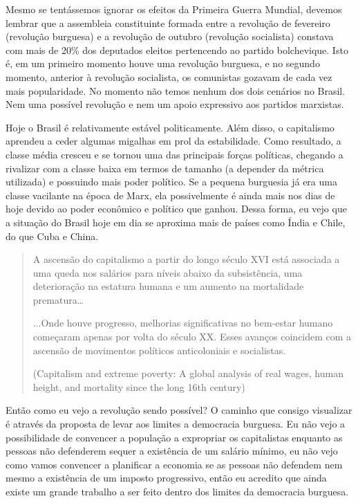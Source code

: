 Mesmo se tentássemos ignorar os efeitos da Primeira Guerra Mundial, devemos lembrar que a assembleia constituinte formada entre a revolução de fevereiro (revolução burguesa) e a revolução de outubro (revolução socialista) constava com mais de 20\% dos deputados eleitos pertencendo ao partido bolchevique. Isto é, em um primeiro momento houve uma revolução burguesa, e no segundo momento, anterior à revolução socialista, os comunistas gozavam de cada vez mais popularidade. No momento não temos nenhum dos dois cenários no Brasil. Nem uma possível revolução e nem um apoio expressivo aos partidos marxistas.

Hoje o Brasil é relativamente estável politicamente. Além disso, o capitalismo aprendeu a ceder algumas migalhas em prol da estabilidade. Como resultado, a classe média cresceu e se tornou uma das principais forças políticas, chegando a rivalizar com a classe baixa em termos de tamanho (a depender da métrica utilizada) e possuindo mais poder político. Se a pequena burguesia já era uma classe vacilante na época de Marx, ela possivelmente é ainda mais nos dias de hoje devido ao poder econômico e político que ganhou. Dessa forma, eu vejo que a situação do Brasil hoje em dia se aproxima mais de países como Índia e Chile, do que Cuba e China.

\begin{quote}
A ascensão do capitalismo a partir do longo século XVI está associada a uma queda nos salários para níveis abaixo da subsistência, uma deterioração na estatura humana e um aumento na mortalidade prematura…

...Onde houve progresso, melhorias significativas no bem-estar humano começaram apenas por volta do século XX. Esses avanços coincidem com a ascensão de movimentos políticos anticoloniais e socialistas.

(Capitalism and extreme poverty: A global analysis of real wages, human height, and mortality since the long 16th century)
\end{quote}

Então como eu vejo a revolução sendo possível? O caminho que consigo visualizar é através da proposta de levar aos limites a democracia burguesa. Eu não vejo a possibilidade de convencer a população a expropriar os capitalistas enquanto as pessoas não defenderem sequer a existência de um salário mínimo, eu não vejo como vamos convencer a planificar a economia se as pessoas não defendem nem mesmo a existência de um imposto progressivo, então eu acredito que ainda existe um grande trabalho a ser feito dentro dos limites da democracia burguesa.

